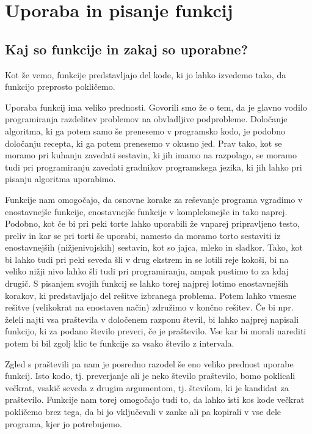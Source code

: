\chapter{Uporaba in pisanje funkcij}
\section{Kaj so funkcije in zakaj so uporabne?}
Kot že vemo, funkcije predstavljajo del kode, ki jo lahko izvedemo tako, da funkcijo preprosto pokličemo. 

Uporaba funkcij ima veliko prednosti. Govorili smo že o tem, da je glavno vodilo programiranja razdelitev problemov na obvladljive podprobleme. Določanje algoritma, ki ga potem samo še prenesemo v programsko kodo, je podobno določanju recepta, ki ga potem prenesemo v okusno jed. Prav tako, kot se moramo pri kuhanju zavedati sestavin, ki jih imamo na razpolago, se moramo tudi pri programiranju zavedati gradnikov programskega jezika, ki jih lahko pri pisanju algoritma uporabimo. 

Funkcije nam omogočajo, da osnovne korake za reševanje programa vgradimo v enostavnejše funkcije, enostavnejše funkcije v kompleksnejše in tako naprej. Podobno, kot če bi pri peki torte lahko uporabili že vnparej pripravljeno testo, preliv in kar se pri torti še uporabi, namesto da moramo torto sestaviti iz enostavnejših (nižjenivojskih) sestavin, kot so jajca, mleko in sladkor. Tako, kot bi lahko tudi pri peki seveda šli v drug ekstrem in se lotili reje kokoši, bi na veliko nižji nivo lahko šli tudi pri programiranju, ampak pustimo to za kdaj drugič. S pisanjem svojih funkcij se lahko torej najprej lotimo enostavnejših korakov, ki predstavljajo del rešitve izbranega problema. Potem lahko vmesne rešitve (velikokrat na enostaven način) združimo v končno rešitev. Če bi npr. želeli najti vsa praštevila v določenem razponu števil, bi lahko najprej napisali funkcijo, ki za podano število preveri, če je praštevilo. Vse kar bi morali narediti potem bi bil zgolj klic te funkcije za vsako število z intervala.

Zgled s praštevili pa nam je posredno razodel še eno veliko prednost uporabe funkcij. Isto kodo, tj. preverjanje ali je neko število praštevilo, bomo poklicali večkrat, vsakič seveda z drugim argumentom, tj. številom, ki je kandidat za praštevilo. Funkcije nam torej omogočajo tudi to, da lahko isti kos kode večkrat pokličemo brez tega, da bi jo vključevali v zanke ali pa kopirali v vse dele programa, kjer jo potrebujemo. 

